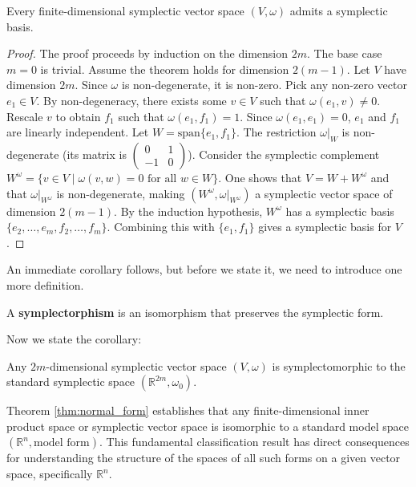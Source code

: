 \begin{theorem} \label{thm:symplectic_basis_exists}
Every finite-dimensional symplectic vector space $(V, \omega)$ admits a symplectic basis.
\end{theorem}
\begin{proof}
The proof proceeds by induction on the dimension $2m$. The base case $m = 0$ is trivial. Assume the theorem holds for dimension $2(m-1)$. Let $V$ have dimension $2m$. Since $\omega$ is non-degenerate, it is non-zero. Pick any non-zero vector $e_1 \in V$. By non-degeneracy, there exists some $v \in V$ such that $\omega(e_1, v) \neq 0$. Rescale $v$ to obtain $f_1$ such that $\omega(e_1, f_1) = 1$. Since $\omega(e_1, e_1) = 0$, $e_1$ and $f_1$ are linearly independent. Let $W = \text{span} \{e_1, f_1\}$. The restriction $\omega|_W$ is non-degenerate (its matrix is $\begin{pmatrix} 0 & 1 \\ -1 & 0 \end{pmatrix}$). Consider the symplectic complement $W^\omega = \{ v \in V \mid \omega(v, w) = 0 \text{ for all } w \in W \}$. One shows that $V = W + W^\omega$ and that $\omega|_{W^\omega}$ is non-degenerate, making $(W^\omega, \omega|_{W^\omega})$ a symplectic vector space of dimension $2(m-1)$. By the induction hypothesis, $W^\omega$ has a symplectic basis $\{ e_2, \dots, e_m, f_2, \dots, f_m \}$. Combining this with $\{ e_1, f_1 \}$ gives a symplectic basis for $V$.
\end{proof}

An immediate corollary follows, but before we state it, we need to introduce one more definition.

\begin{definition}
    A \textbf{symplectorphism} is an isomorphism that preserves the symplectic form.
\end{definition}

Now we state the corollary:
\begin{corollary} \label{cor:symplectomorphic}
Any $2m$-dimensional symplectic vector space $(V, \omega)$ is symplectomorphic to the standard symplectic space $(\mathbb{R}^{2m}, \omega_0)$.
\end{corollary}

Theorem \ref{thm:normal_form} establishes that any finite-dimensional inner product space or symplectic vector space is isomorphic to a standard model space $(\mathbb{R}^n, \text{model form})$. This fundamental classification result has direct consequences for understanding the structure of the spaces of all such forms on a given vector space, specifically $\mathbb{R}^n$. 

